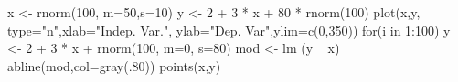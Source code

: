\begin{Schunk}
\begin{Sinput}
 x <- rnorm(100, m=50,s=10)
 y <- 2 + 3 * x + 80 * rnorm(100)
 plot(x,y, type="n",xlab="Indep. Var.", ylab="Dep. Var",ylim=c(0,350))
 for(i in 1:100){
    y <- 2 + 3 * x + rnorm(100, m=0, s=80)
    mod <- lm (y ~ x)
    abline(mod,col=gray(.80))
  }
 points(x,y)
\end{Sinput}
\end{Schunk}
